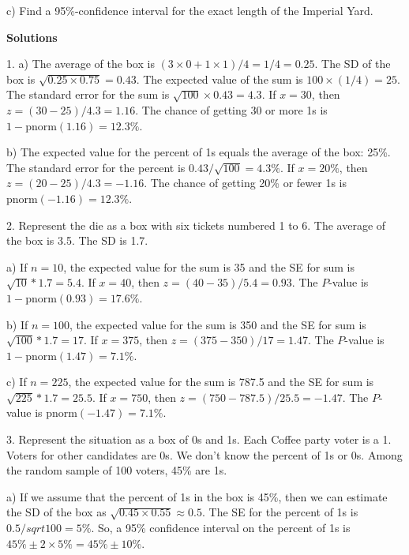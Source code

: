 \documentclass[10pt]{article}
\begin{document}
\hspace{10pt} c) Find a 95\%-confidence interval for the exact length of the
Imperial Yard.
\vspace{.5in}


\vfill
\eject

\begin{center}
{\large\textbf{Solutions}}
\end{center}\vspace{-6pt}
\small\setlength{\baselineskip}{0.98\baselineskip}

1. a) The average of the box is $(3\times 0 + 1\times 1)/4 = 1/4=0.25$.  The SD of the box
is $\sqrt{0.25\times 0.75}=0.43$.  The expected value of the sum is $100\times (1/4) = 25$.
The standard error for the sum is $\sqrt{100}\times 0.43 = 4.3$.  If $x=30$, then 
$z=(30-25)/4.3=1.16$.  The chance of getting 30 or more 1s is $1 - \mbox{pnorm}(1.16)=12.3\%$.

b) The expected value for the percent of 1s equals the average of
the box:  25\%.  The standard error for the percent is $0.43/\sqrt{100} = 4.3\%$.
If $x=20\%$, then $z=(20-25)/4.3=-1.16$.  The chance of getting 20\% or fewer 1s is 
$\mbox{pnorm}(-1.16)=12.3\%$.
\smallskip

2. Represent the die as a box with six tickets numbered 1 to 6.  The average of the box is 3.5.  The 
SD is 1.7.  

a) If $n=10$, the expected value for the sum is 35 and the SE for sum is $\sqrt{10}*1.7= 5.4$.  
If $x=40$, then $z=(40-35)/5.4 = 0.93$.  The $P$-value is $1 - \mbox{pnorm}(0.93)=17.6\%$.

b) If $n=100$, the expected value for the sum is 350 and the SE for sum is $\sqrt{100}*1.7= 17$.  
If $x=375$, then $z=(375-350)/17 = 1.47$.  The $P$-value is $1 - \mbox{pnorm}(1.47)=7.1\%$.

c) If $n=225$, the expected value for the sum is 787.5 and the SE for sum is $\sqrt{225}*1.7= 25.5$.  
If $x=750$, then $z=(750-787.5)/25.5 = -1.47$.  The $P$-value is $\mbox{pnorm}(-1.47)=7.1\%$.
\smallskip

3. Represent the situation as a box of 0s and 1s.  Each Coffee party voter is a 1.  Voters for other 
candidates are 0s.  We don't know the percent of 1s or 0s.  Among the random sample of 100 voters,
45\% are 1s.

a) If we assume that the percent of 1s in the box is 45\%, then we can estimate the SD of the 
box as $\sqrt{0.45\times 0.55}\approx 0.5$.  The SE for the percent of 1s is $0.5/sqrt{100}= 5\%$.
So, a 95\% confidence interval on the percent of 1s is $45\%\pm 2\times 5\% = 45\% \pm 10\%$. 
\end{document}
